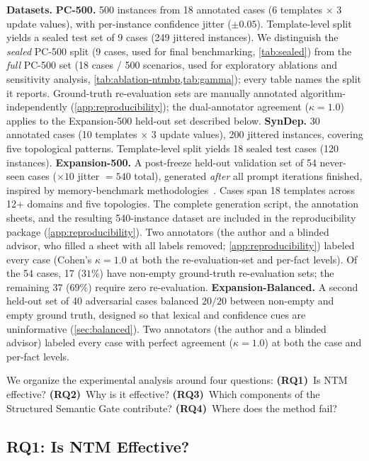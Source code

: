 \documentclass{article}
\theoremstyle{definition}
\begin{document}
\textbf{Datasets.}
\textbf{PC-500.}  500 instances from 18 annotated cases (6 templates
$\times$ 3 update values), with per-instance confidence jitter
($\pm0.05$).  Template-level split yields a sealed test set of 9 cases
(249 jittered instances).  We distinguish the \emph{sealed} PC-500 split
(9 cases, used for final benchmarking, \cref{tab:sealed}) from the
\emph{full} PC-500 set (18 cases / 500 scenarios, used for exploratory
ablations and sensitivity analysis, \cref{tab:ablation-ntmbp,tab:gamma});
every table names the split it reports.  Ground-truth re-evaluation sets
are manually annotated algorithm-independently
(\cref{app:reproducibility}); the dual-annotator agreement ($\kappa=1.0$)
applies to the Expansion-500 held-out set described below.
\textbf{SynDep.}  30 annotated cases (10 templates $\times$ 3 update
values), 200 jittered instances, covering five topological patterns.
Template-level split yields 18 sealed test cases (120 instances).
\textbf{Expansion-500.}  A post-freeze held-out validation set of 54
never-seen cases ($\times 10$ jitter $= 540$ total), generated
\emph{after} all prompt iterations finished, inspired by
memory-benchmark methodologies~\cite{longmemeval,yushuai2025memorybench}.  Cases span 18 templates
across 12+ domains and five topologies.  The complete generation script,
the annotation sheets, and the resulting 540-instance dataset are included
in the reproducibility package (\cref{app:reproducibility}).
Two annotators (the author and a
blinded advisor, who filled a sheet with all labels
removed; \cref{app:reproducibility}) labeled
every case (Cohen's $\kappa=1.0$ at both the re-evaluation-set and
per-fact levels).  Of the 54 cases, 17 ($31\%$) have non-empty
ground-truth re-evaluation sets; the remaining 37 ($69\%$) require
zero re-evaluation.
\textbf{Expansion-Balanced.}  A second held-out set of 40 adversarial
cases balanced $20/20$ between non-empty and empty ground truth, designed
so that lexical and confidence cues are uninformative
(\cref{sec:balanced}).  Two annotators (the author and a blinded advisor)
labeled every case with perfect agreement ($\kappa=1.0$) at both the
case and per-fact levels.

We organize the experimental analysis around four questions:
\textbf{(RQ1)}~Is NTM effective?
\textbf{(RQ2)}~Why is it effective?
\textbf{(RQ3)}~Which components of the Structured Semantic Gate
contribute?
\textbf{(RQ4)}~Where does the method fail?

\subsection{RQ1: Is NTM Effective?}
\label{sec:rq1}
\end{document}
